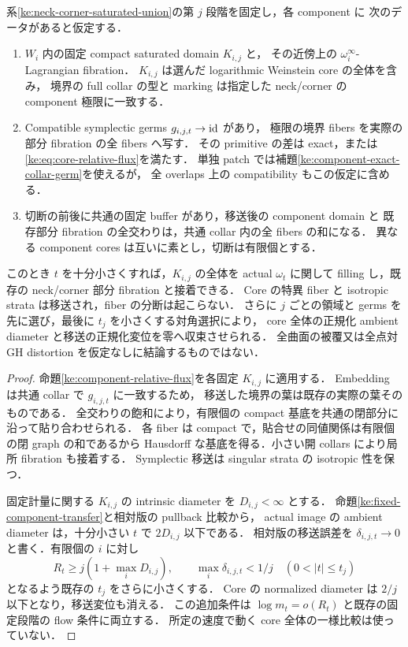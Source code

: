 \begin{corollary}
\label{ke:conditional-component-core-filling}
系\ref{ke:neck-corner-saturated-union}の第 $j$ 段階を固定し，各 component に
次のデータがあると仮定する．
\begin{enumerate}
\item $W_i$ 内の固定 compact saturated domain $K_{i,j}$ と，
  その近傍上の $\omega_i^\infty$-Lagrangian fibration．
  $K_{i,j}$ は選んだ logarithmic Weinstein core の全体を含み，
  境界の full collar の型と marking は指定した neck/corner の component 極限に一致する．
\item Compatible symplectic germs $g_{i,j,t}\to\operatorname{id}$ があり，
  極限の境界 fibers を実際の部分 fibration の全 fibers へ写す．
  その primitive の差は exact，または\eqref{ke:eq:core-relative-flux}を満たす．
  単独 patch では補題\ref{ke:component-exact-collar-germ}を使えるが，
  全 overlaps 上の compatibility もこの仮定に含める．
\item 切断の前後に共通の固定 buffer があり，移送後の component domain と
  既存部分 fibration の全交わりは，共通 collar 内の全 fibers の和になる．
  異なる component cores は互いに素とし，切断は有限個とする．
\end{enumerate}
このとき $t$ を十分小さくすれば，$K_{i,j}$ の全体を actual $\omega_t$ に関して
filling し，既存の neck/corner 部分 fibration と接着できる．
Core の特異 fiber と isotropic strata は移送され，fiber の分断は起こらない．
さらに $j$ ごとの領域と germs を先に選び，最後に $t_j$ を小さくする対角選択により，
core 全体の正規化 ambient diameter と移送の正規化変位を零へ収束させられる．
全曲面の被覆又は全点対 GH distortion を仮定なしに結論するものではない．
\end{corollary}

\begin{proof}
命題\ref{ke:component-relative-flux}を各固定 $K_{i,j}$ に適用する．
Embedding は共通 collar で $g_{i,j,t}$ に一致するため，
移送した境界の葉は既存の実際の葉そのものである．
全交わりの飽和により，有限個の compact 基底を共通の閉部分に沿って貼り合わせられる．
各 fiber は compact で，貼合せの同値関係は有限個の閉 graph の和であるから
Hausdorff な基底を得る．小さい開 collars により局所 fibration も接着する．
Symplectic 移送は singular strata の isotropic 性を保つ．

固定計量に関する $K_{i,j}$ の intrinsic diameter を $D_{i,j}<\infty$ とする．
命題\ref{ke:fixed-component-transfer}と相対版の pullback 比較から，
actual image の ambient diameter は，十分小さい $t$ で $2D_{i,j}$ 以下である．
相対版の移送誤差を $\delta_{i,j,t}\to0$ と書く．有限個の $i$ に対し
\[
 R_t\ge j\left(1+\max_iD_{i,j}\right),\qquad
 \max_i\delta_{i,j,t}<1/j\quad(0<|t|\le t_j)
\]
となるよう既存の $t_j$ をさらに小さくする．
Core の normalized diameter は $2/j$ 以下となり，移送変位も消える．
この追加条件は $\log m_t=o(R_t)$ と既存の固定段階の flow 条件に両立する．
所定の速度で動く core 全体の一様比較は使っていない．
\end{proof}

